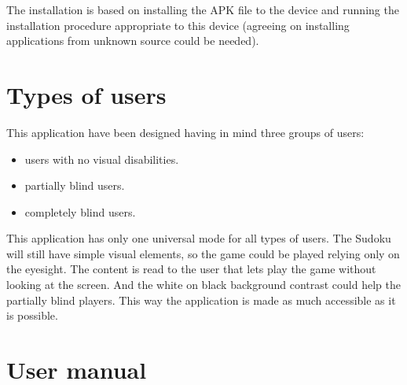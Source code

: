 \documentclass[a4paper,twoside,12pt]{book}
\begin{document}

\par
The installation is based on installing the APK file to the device and running the installation procedure appropriate to this device (agreeing on installing applications from unknown source could be needed).


\section{Types of users}
\par This application have been designed having in mind three groups of users:
\begin{itemize}
\item users with no visual disabilities.
\item partially blind users.
\item completely blind users.
\end{itemize}

\par This application has only one universal mode for all types of users. The Sudoku will still have simple visual elements, so the game could be played relying only on the eyesight. The content is read to the user that lets play the game without looking at the screen. And the white on black background contrast could help the partially blind players. This way the application is made as much accessible as it is possible.

\section{User manual}
\end{document}
